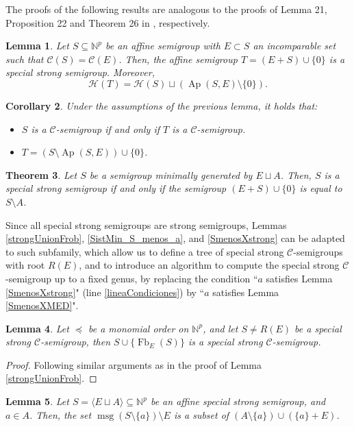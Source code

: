\documentclass[a4paper,11pt]{article}
\newtheorem{theorem}{Theorem}
\newtheorem{corollary}[theorem]{Corollary}
\newtheorem{lemma}[theorem]{Lemma}
\def\CaH{\mathcal{H}}
\def\CaC{\mathcal{C}}
\def\N{\mathbb{N}}
\def\msg{\operatorname{msg}}
\def\Fb{\operatorname{Fb}}
\def\Ap{\operatorname{Ap}}
\begin{document}
{The proofs of the following results are analogous to the proofs of Lemma 21, Proposition 22 and Theorem 26 in \cite{G-T-V25_MED}, respectively.

\begin{lemma}
Let $S\subseteq \N^p$ be an affine semigroup with $E\subset S$ an incomparable set such that $\CaC(S)=\CaC(E)$. Then, the affine semigroup $T=(E+S)\cup \{0\}$ is a special strong semigroup. Moreover, $$\CaH(T)=\CaH(S)\sqcup \left(\Ap (S,E)\setminus\{0\}\right).$$
\end{lemma}

\begin{corollary}
Under the assumptions of the previous lemma, it holds that:
    \begin{itemize}
        \item $S$ is a $\CaC$-semigroup if and only if $T$ is a $\CaC$-semigroup.
        \item $T=\left(S\setminus \Ap (S,E) \right)\cup \{0\}$.
    \end{itemize}
\end{corollary}

\begin{theorem}
Let $S$ be a semigroup minimally generated by $E\sqcup A$. Then, $S$ is a special strong semigroup if and only if the semigroup $(E+S)\cup \{0\}$ is equal to $S\setminus A$.
\end{theorem}

Since all special strong semigroups are strong semigroups, Lemmas \ref{strongUnionFrob}, \ref{SistMin_S_menos_a}, and \ref{SmenosXstrong} can be adapted to such subfamily, which allow us to define a tree of special strong $\CaC$-semigroups with root $R(E)$, and to introduce an algorithm to compute the special strong $\CaC$-semigroup up to a fixed genus, by replacing the condition ``$a$ satisfies Lemma \ref{SmenosXstrong}" (line \ref{lineaCondiciones}) by ``$a$ satisfies Lemma \ref{SmenosXMED}".

\begin{lemma}\label{MEDUnionFrob}
Let $\preceq$ be a monomial order on $\N^p$, and let $S\neq R(E)$ be a special strong $\CaC$-semigroup, then $S \cup \{\Fb_E(S)\}$ is a special strong $\CaC$-semigroup.
\end{lemma}

\begin{proof}
Following similar arguments as in the proof of Lemma \ref{strongUnionFrob}.
\end{proof}

\begin{lemma}\label{MEDSistMin_S_menos_a}
Let $S=\langle E\sqcup A\rangle\subseteq \N^p$ be an affine special strong semigroup, and $a\in A$. Then, the set $\msg (S\setminus\{a\})\setminus E$ is a subset of $(A\setminus\{a\}) \cup (\{a\}+E)$.
\end{lemma}

}
\end{document}
